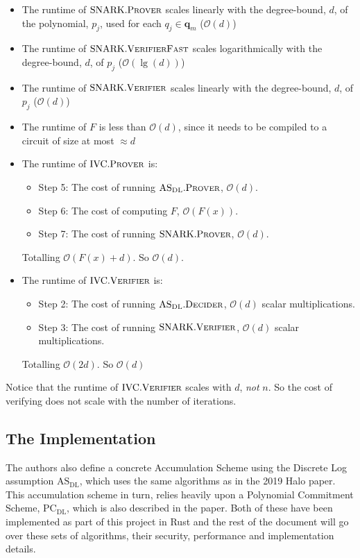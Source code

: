 \documentclass[
]{article}
\providecommand{\tightlist}{%
  \setlength{\itemsep}{0pt}\setlength{\parskip}{0pt}}
\newcommand*\Oc{\mathcal{O}}
\renewcommand{\vec}[1]{ \boldsymbol{#1} }
\newcommand*{\Prover}{\mathrm{\text{P\scriptsize ROVER}}}
\newcommand*{\Verifier}{\mathrm{\text{V\scriptsize ERIFIER}}}
\newcommand*{\SNARKProver}{\mathrm{\text{SNARK}}.\Prover}
\newcommand*{\SNARKVerifier}{\mathrm{\text{SNARK}}.\Verifier}
\newcommand*{\SNARKVerifierFast}{\mathrm{\text{SNARK}}.\mathrm{\text{V\scriptsize ERIFIER}\text{F\scriptsize AST}}}
\newcommand*{\IVCProver}{\mathrm{\text{IVC}}.\Prover}
\newcommand*{\IVCVerifier}{\mathrm{\text{IVC}}.\Verifier}
\newcommand*{\PCDL}{\text{PC}_{\text{DL}}}
\newcommand*{\ASDL}{\text{AS}_{\text{DL}}}
\newcommand*{\ASDLProver}{\ASDL.\mathrm{\text{P\scriptsize ROVER}}}
\newcommand*{\ASDLDecider}{\ASDL.\mathrm{\text{D\scriptsize ECIDER}}}
\begin{document}
\begin{itemize}
\item
  The runtime of \(\SNARKProver\) scales linearly with the degree-bound,
  \(d\), of the polynomial, \(p_j\), used for each \(q_j \in \vec{q}_m\)
  (\(\Oc(d)\))
\item
  The runtime of \(\SNARKVerifierFast\) scales logarithmically with the
  degree-bound, \(d\), of \(p_j\) (\(\Oc(\lg(d))\))
\item
  The runtime of \(\SNARKVerifier\) scales linearly with the
  degree-bound, \(d\), of \(p_j\) (\(\Oc(d)\))
\item
  The runtime of \(F\) is less than \(\Oc(d)\), since it needs to be
  compiled to a circuit of size at most \(\approx d\)
\item
  The runtime of \(\IVCProver\) is:

  \begin{itemize}
  \tightlist
  \item
    Step 5: The cost of running \(\ASDLProver\), \(\Oc(d)\).
  \item
    Step 6: The cost of computing \(F\), \(\Oc(F(x))\).
  \item
    Step 7: The cost of running \(\SNARKProver\), \(\Oc(d)\).
  \end{itemize}

  Totalling \(\Oc(F(x) + d)\). So \(\Oc(d)\).
\item
  The runtime of \(\IVCVerifier\) is:

  \begin{itemize}
  \tightlist
  \item
    Step 2: The cost of running \(\ASDLDecider\), \(\Oc(d)\) scalar
    multiplications.
  \item
    Step 3: The cost of running \(\SNARKVerifier\), \(\Oc(d)\) scalar
    multiplications.
  \end{itemize}

  Totalling \(\Oc(2d)\). So \(\Oc(d)\)
\end{itemize}

Notice that the runtime of \(\IVCVerifier\) scales with \(d\),
\emph{not} \(n\). So the cost of verifying does not scale with the
number of iterations.

\subsection{The Implementation}\label{the-implementation}

The authors also define a concrete Accumulation Scheme using the
Discrete Log assumption \(\ASDL\), which uses the same algorithms as in
the 2019 Halo paper. This accumulation scheme in turn, relies heavily
upon a Polynomial Commitment Scheme, \(\PCDL\), which is also described
in the paper. Both of these have been implemented as part of this
project in Rust and the rest of the document will go over these sets of
algorithms, their security, performance and implementation details.
\end{document}
